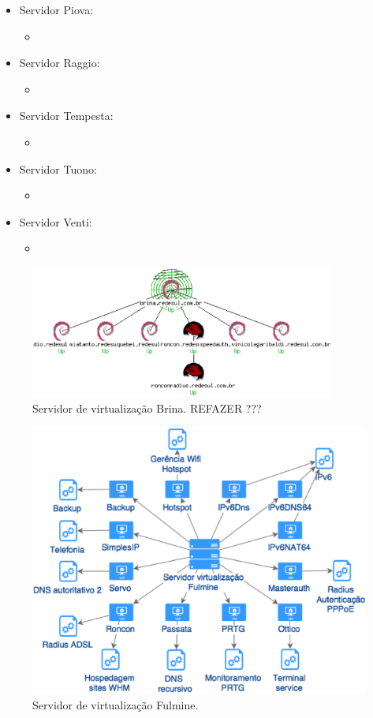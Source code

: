 \begin{itemize}
\begin{itemize}
 \end{itemize}
 \item Servidor Piova: 
 \begin{itemize}
  \item 
 \end{itemize}
 \item Servidor Raggio: 
 \begin{itemize}
  \item 
 \end{itemize}
 \item Servidor Tempesta: 
 \begin{itemize}
  \item 
 \end{itemize}
 \item Servidor Tuono: 
 \begin{itemize}
  \item 
 \end{itemize}
 \item Servidor Venti: 
 \begin{itemize}
  \item 
 \end{itemize}
\end{itemize}

\begin{figure}[h!]
 \centering
 \includegraphics[width=380px]{img/servlog1.eps}
 \caption{Servidor de virtualização Brina. REFAZER ???}
 \label{fig:servlog1}
\end{figure}

\begin{figure}[h!]
 \centering
 \includegraphics[width=430px]{img/servlog2.eps}
 \caption{Servidor de virtualização Fulmine.}
 \label{fig:servlog2}
\end{figure}

